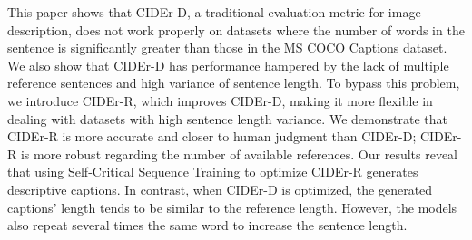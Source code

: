 This paper shows that CIDEr-D, a traditional evaluation metric for image description, does not work properly on datasets where the number of words in the sentence is significantly greater than those in the MS COCO Captions dataset. We also show that CIDEr-D has performance hampered by the lack of multiple reference sentences and high variance of sentence length. To bypass this problem, we introduce CIDEr-R, which improves CIDEr-D, making it more flexible in dealing with datasets with high sentence length variance. We demonstrate that CIDEr-R is more accurate and closer to human judgment than CIDEr-D; CIDEr-R is more robust regarding the number of available references. Our results reveal that using Self-Critical Sequence Training to optimize CIDEr-R generates descriptive captions. In contrast, when CIDEr-D is optimized, the generated captions' length tends to be similar to the reference length. However, the models also repeat several times the same word to increase the sentence length.
